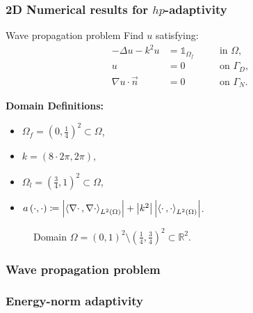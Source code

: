 \begin{frame}
  \frametitle{2D Numerical results for $hp$-adaptivity}
  
  \begin{block}{Wave propagation problem}
     Find \(u\) satisfying:
    \begin{alignat}{2}
      - \Delta u -k^{2}u   & = \mathds{1}_{\Omega_{f}} &  & \quad \text{in } \Omega, \label{eq:helmholtzgoal} \\
      u                    & = 0                       &  & \quad \text{on } \Gamma_{D}, \\
      \nabla u \cdot \vec{n} & = 0                     &  & \quad \text{on } \Gamma_{N}.
    \end{alignat}
  \end{block}

  \begin{multicols}{2}
    \textbf{Domain Definitions:}
    \begin{itemize}
      \item \(\Omega_{f} = \left(0,\frac{1}{4}\right)^{2} \subset \Omega\), 
      \item \(k = \left(8 \cdot 2 \pi, 2 \pi\right)\), 
      \item \(\Omega_{l} = \left(\frac{3}{4},1\right)^{2} \subset \Omega\),
      \item \(a\left(\cdot ,\cdot\right) \coloneqq \left|\left<\nabla \cdot\,,\nabla \cdot\right>_{L^{2}\left(\Omega\right)}\right| + \left|k^{2}\right| \left|\left<\cdot\,,\cdot\right>_{L^{2}\left(\Omega\right)}\right|\).
    \end{itemize}

   \begin{figure}
      \centering
      
      \caption{Domain \(\Omega = \left(0,1\right)^{2} \setminus \left(\frac{1}{4},\frac{3}{4}\right)^{2} \subset \mathbb{R}^{2}\).}
    \end{figure}

  \end{multicols}

\end{frame}

\begin{frame}
	\frametitle{Wave propagation problem}
	\begin{figure}[t!]
	\end{figure}
\end{frame}

\begin{frame}
	\frametitle{Energy-norm adaptivity}
\end{frame}

